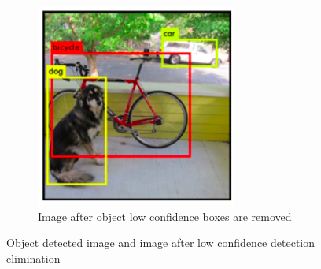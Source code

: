 \documentclass[conference]{IEEEtran}
\begin{document}
\begin{figure}[ht]
\begin{subfigure}[b]{0.45\linewidth}
    \includegraphics[width=\linewidth]{images/Picture38.png}
    \caption{Image after object low confidence boxes are removed}
  \end{subfigure}
  \caption{Object detected image and image after low confidence detection elimination}
  \label{fig:combined10}
\end{figure}
\end{document}
